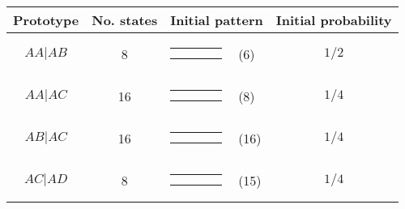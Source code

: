 \begin{center}
\begin{tabular}{ccrlc} \hline
Prototype & No. states & \multicolumn{2}{c}{Initial pattern} & Initial probability \\ \hline
$AA|AB$ & 8 & 
{\renewcommand{\arraystretch}{0.3}
\renewcommand{\tabcolsep}{0.5mm}
\parbox[b][3mm][c]{12mm}{
\begin{tabular}{|p{2mm}|p{2mm}||p{2mm}|p{2mm}|} \hline
$\bullet$ &           &           &           \\
$\bullet$ & $\circ  $ &           &           \\ \hline
\end{tabular}}}
& (6) & $1/2$ \\
$AA|AC$ & 16 & 
{\renewcommand{\arraystretch}{0.3}
\renewcommand{\tabcolsep}{0.5mm}
\parbox[b][3mm][c]{12mm}{
\begin{tabular}{|p{2mm}|p{2mm}||p{2mm}|p{2mm}|} \hline
$\bullet$ &           &           &           \\
$\bullet$ &           & $\circ  $ &           \\ \hline
\end{tabular}}}
& (8) & $1/4$ \\
$AB|AC$ & 16 & 
{\renewcommand{\arraystretch}{0.3}
\renewcommand{\tabcolsep}{0.5mm}
\parbox[b][3mm][c]{12mm}{
\begin{tabular}{|p{2mm}|p{2mm}||p{2mm}|p{2mm}|} \hline
$\bullet$ &           &           &           \\
          & $\bullet$ & $\circ  $ &           \\ \hline
\end{tabular}}}
& (16) & $1/4$ \\
$AC|AD$ & 8 & 
{\renewcommand{\arraystretch}{0.3}
\renewcommand{\tabcolsep}{0.5mm}
\parbox[b][3mm][c]{12mm}{
\begin{tabular}{|p{2mm}|p{2mm}||p{2mm}|p{2mm}|} \hline
$\bullet$ &           &           &           \\
          &           & $\bullet$ & $\circ  $ \\ \hline
\end{tabular}}}
& (15) & $1/4$ \\
\hline
\end{tabular}
\end{center}
